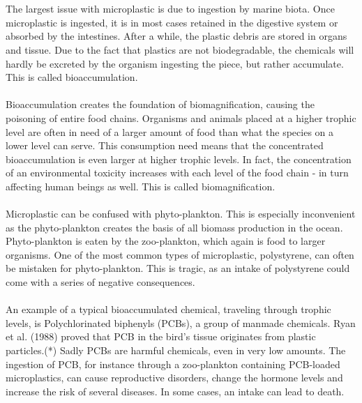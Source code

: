 \\\\
The largest issue with microplastic is due to ingestion by marine biota. Once microplastic is ingested, it is in most cases retained in the digestive system or absorbed by the intestines. After a while, the plastic debris are stored in organs and tissue. Due to the fact that plastics are not biodegradable, the chemicals will hardly be excreted by the organism ingesting the piece, but rather accumulate. This is called bioaccumulation. 
\\\\
Bioaccumulation creates the foundation of biomagnification, causing the poisoning of entire food chains. Organisms and animals placed at a higher trophic level are often in need of a larger amount of food than what the species on a lower level can serve. This consumption need means that the concentrated bioaccumulation is even larger at higher trophic levels. In fact, the concentration of an environmental toxicity increases with each level of the food chain - in turn affecting human beings as well. This is called biomagnification. 
\\\\
Microplastic can be confused with phyto-plankton. This is especially inconvenient as the phyto-plankton creates the basis of all biomass production in the ocean. Phyto-plankton is eaten by the zoo-plankton, which again is food to larger organisms. One of the most common types of microplastic, polystyrene, can often be mistaken for phyto-plankton. This is tragic, as an intake of polystyrene could come with a series of negative consequences. %
\\\\
An example of a typical bioaccumulated chemical, traveling through trophic levels, is Polychlorinated biphenyls (PCBs), a group of manmade chemicals. Ryan et al. (1988) proved that PCB in the bird's tissue originates from plastic particles.(*) Sadly PCBs are harmful chemicals, even in very low amounts. The ingestion of PCB, for instance through a zoo-plankton containing PCB-loaded microplastics, can cause reproductive disorders, change the hormone levels and increase the risk of several diseases. In some cases, an intake can lead to death. %
\\\\

